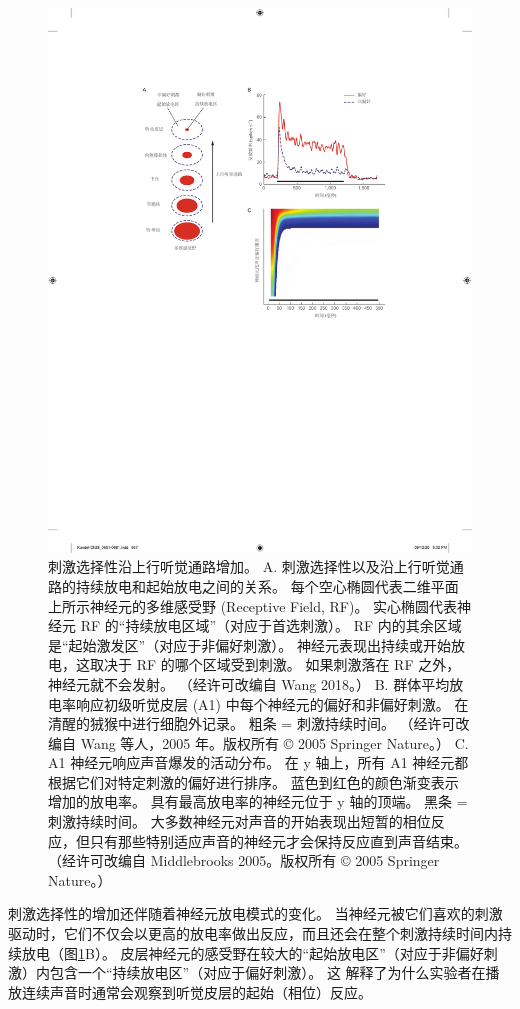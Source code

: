 \begin{figure}[htbp]
	\centering
	\includegraphics[width=0.5\linewidth]{chap28/fig_28_9}
	\caption{刺激选择性沿上行听觉通路增加。 
		A. 刺激选择性以及沿上行听觉通路的持续放电和起始放电之间的关系。 
		每个空心椭圆代表二维平面上所示神经元的多维感受野 (Receptive Field, RF)。 
		实心椭圆代表神经元 RF 的“持续放电区域”（对应于首选刺激）。 
		RF 内的其余区域是“起始激发区”（对应于非偏好刺激）。 
		神经元表现出持续或开始放电，这取决于 RF 的哪个区域受到刺激。 
		如果刺激落在 RF 之外，神经元就不会发射。 （经许可改编自 Wang 2018。）
		B. 群体平均放电率响应初级听觉皮层 (A1) 中每个神经元的偏好和非偏好刺激。 
		在清醒的狨猴中进行细胞外记录。 粗条 = 刺激持续时间。 
		（经许可改编自 Wang 等人，2005 年。版权所有 © 2005 Springer Nature。）
		C. A1 神经元响应声音爆发的活动分布。 
		在 y 轴上，所有 A1 神经元都根据它们对特定刺激的偏好进行排序。 
		蓝色到红色的颜色渐变表示增加的放电率。 
		具有最高放电率的神经元位于 y 轴的顶端。 黑条 = 刺激持续时间。 
		大多数神经元对声音的开始表现出短暂的相位反应，但只有那些特别适应声音的神经元才会保持反应直到声音结束。 
		（经许可改编自 Middlebrooks 2005。版权所有 © 2005 Springer Nature。）}
	\label{fig:28_9}
\end{figure}

刺激选择性的增加还伴随着神经元放电模式的变化。 
当神经元被它们喜欢的刺激驱动时，它们不仅会以更高的放电率做出反应，而且还会在整个刺激持续时间内持续放电（图\ref{fig:28_9}B）。 
皮层神经元的感受野在较大的“起始放电区”（对应于非偏好刺激）内包含一个“持续放电区”（对应于偏好刺激）。 这
解释了为什么实验者在播放连续声音时通常会观察到听觉皮层的起始（相位）反应。

